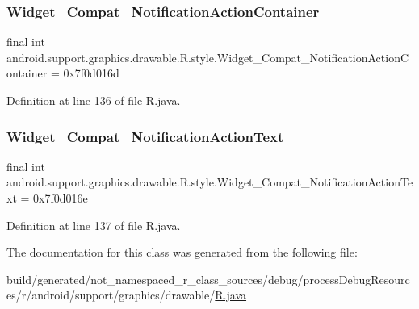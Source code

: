 \mbox{\label{classandroid_1_1support_1_1graphics_1_1drawable_1_1_r_1_1style_a1d8f04477885f72e43116dd03c334cfd}} 
\subsubsection{\texorpdfstring{Widget\_Compat\_NotificationActionContainer}{Widget\_Compat\_NotificationActionContainer}}
{\footnotesize\ttfamily final int android.\+support.\+graphics.\+drawable.\+R.\+style.\+Widget\+\_\+\+Compat\+\_\+\+Notification\+Action\+Container = 0x7f0d016d\hspace{0.3cm}{\ttfamily [static]}}



Definition at line 136 of file R.\+java.

\mbox{\label{classandroid_1_1support_1_1graphics_1_1drawable_1_1_r_1_1style_a490bf3c12ac2da8140c682ca1cda94ed}} 
\subsubsection{\texorpdfstring{Widget\_Compat\_NotificationActionText}{Widget\_Compat\_NotificationActionText}}
{\footnotesize\ttfamily final int android.\+support.\+graphics.\+drawable.\+R.\+style.\+Widget\+\_\+\+Compat\+\_\+\+Notification\+Action\+Text = 0x7f0d016e\hspace{0.3cm}{\ttfamily [static]}}



Definition at line 137 of file R.\+java.



The documentation for this class was generated from the following file\+:\begin{DoxyCompactItemize}
\item 
build/generated/not\+\_\+namespaced\+\_\+r\+\_\+class\+\_\+sources/debug/process\+Debug\+Resources/r/android/support/graphics/drawable/\mbox{\hyperlink{android_2support_2graphics_2drawable_2_r_8java}{R.\+java}}\end{DoxyCompactItemize}
